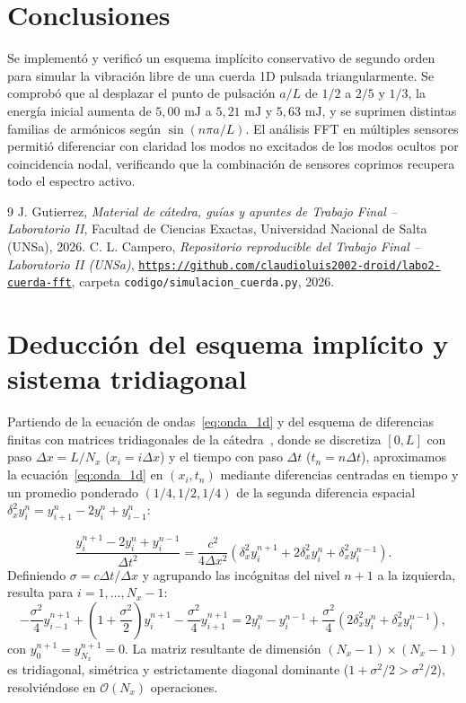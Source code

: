 \documentclass[11pt,a4paper]{article}
\begin{document}
\section{Conclusiones}
Se implementó y verificó un esquema implícito conservativo de segundo orden para simular la vibración libre de una cuerda 1D pulsada triangularmente. Se comprobó que al desplazar el punto de pulsación $a/L$ de $1/2$ a $2/5$ y $1/3$, la energía inicial aumenta de $5{,}00\text{ mJ}$ a $5{,}21\text{ mJ}$ y $5{,}63\text{ mJ}$, y se suprimen distintas familias de armónicos según $\sin(n\pi a/L)$. El análisis FFT en múltiples sensores permitió diferenciar con claridad los modos no excitados de los modos ocultos por coincidencia nodal, verificando que la combinación de sensores coprimos recupera todo el espectro activo.
\begin{thebibliography}{9}
 J. Gutierrez, \textit{Material de cátedra, guías y apuntes de Trabajo Final -- Laboratorio II}, Facultad de Ciencias Exactas, Universidad Nacional de Salta (UNSa), 2026.
 C. L. Campero, \textit{Repositorio reproducible del Trabajo Final -- Laboratorio II (UNSa)}, \href{https://github.com/claudioluis2002-droid/labo2-cuerda-fft}{\texttt{https://github.com/claudioluis2002-droid/labo2-cuerda-fft}}, carpeta \texttt{codigo/simulacion\_cuerda.py}, 2026.
\end{thebibliography}
\appendix
\section{Deducción del esquema implícito y sistema tridiagonal}
\label{ap:esquema_implicito}

Partiendo de la ecuación de ondas~\eqref{eq:onda_1d} y del esquema de diferencias finitas con matrices tridiagonales de la cátedra~\cite{gutierrez}, donde se discretiza $[0,L]$ con paso $\Delta x = L/N_x$ ($x_i = i\Delta x$) y el tiempo con paso $\Delta t$ ($t_n = n\Delta t$), aproximamos la ecuación~\eqref{eq:onda_1d} en $(x_i, t_n)$ mediante diferencias centradas en tiempo y un promedio ponderado $(1/4, 1/2, 1/4)$ de la segunda diferencia espacial $\delta_x^2 y_i^n = y_{i+1}^n - 2y_i^n + y_{i-1}^n$:

\begin{equation}
\frac{y_i^{n+1} - 2y_i^n + y_i^{n-1}}{\Delta t^2} = \frac{c^2}{4\Delta x^2}\left(\delta_x^2 y_i^{n+1} + 2\delta_x^2 y_i^n + \delta_x^2 y_i^{n-1}\right).
\end{equation}
Definiendo $\sigma = c\Delta t/\Delta x$ y agrupando las incógnitas del nivel $n+1$ a la izquierda, resulta para $i = 1, \dots, N_x - 1$:
\begin{equation}
-\frac{\sigma^2}{4} y_{i-1}^{n+1} + \left(1 + \frac{\sigma^2}{2}\right) y_i^{n+1} - \frac{\sigma^2}{4} y_{i+1}^{n+1} = 2y_i^n - y_i^{n-1} + \frac{\sigma^2}{4}\left(2\delta_x^2 y_i^n + \delta_x^2 y_i^{n-1}\right),
\end{equation}
con $y_0^{n+1} = y_{N_x}^{n+1} = 0$. La matriz resultante de dimensión $(N_x - 1) \times (N_x - 1)$ es tridiagonal, simétrica y estrictamente diagonal dominante ($1 + \sigma^2/2 > \sigma^2/2$), resolviéndose en $\mathcal{O}(N_x)$ operaciones.
\end{document}
